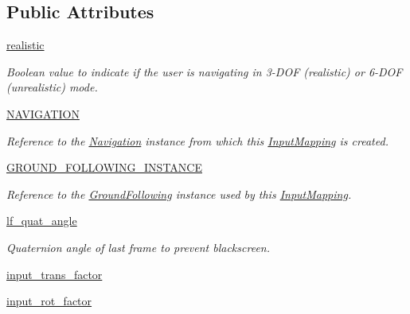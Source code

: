 \subsection*{\-Public \-Attributes}
\begin{DoxyCompactItemize}
\item 
\hyperlink{classlib_1_1InputMapping_1_1InputMapping_a396458f246bffe449a0579ebea3f2180}{realistic}
\begin{DoxyCompactList}\small\item\em \-Boolean value to indicate if the user is navigating in 3-\/\-D\-O\-F (realistic) or 6-\/\-D\-O\-F (unrealistic) mode. \end{DoxyCompactList}\item 
\hyperlink{classlib_1_1InputMapping_1_1InputMapping_a100f4ad4024ad43b6979661150401dd8}{\-N\-A\-V\-I\-G\-A\-T\-I\-O\-N}
\begin{DoxyCompactList}\small\item\em \-Reference to the \hyperlink{namespacelib_1_1Navigation}{\-Navigation} instance from which this \hyperlink{classlib_1_1InputMapping_1_1InputMapping}{\-Input\-Mapping} is created. \end{DoxyCompactList}\item 
\hyperlink{classlib_1_1InputMapping_1_1InputMapping_a1df8b547b3cd8df7a8c89c3ce682202c}{\-G\-R\-O\-U\-N\-D\-\_\-\-F\-O\-L\-L\-O\-W\-I\-N\-G\-\_\-\-I\-N\-S\-T\-A\-N\-C\-E}
\begin{DoxyCompactList}\small\item\em \-Reference to the \hyperlink{namespacelib_1_1GroundFollowing}{\-Ground\-Following} instance used by this \hyperlink{classlib_1_1InputMapping_1_1InputMapping}{\-Input\-Mapping}. \end{DoxyCompactList}\item 
\hyperlink{classlib_1_1InputMapping_1_1InputMapping_a23fb40438e3288f6b762b917fb55694e}{lf\-\_\-quat\-\_\-angle}
\begin{DoxyCompactList}\small\item\em \-Quaternion angle of last frame to prevent blackscreen. \end{DoxyCompactList}\item 
\hyperlink{classlib_1_1InputMapping_1_1InputMapping_a8fd624b0a9dab37f427ae7ffdd35a88c}{input\-\_\-trans\-\_\-factor}
\item 
\hyperlink{classlib_1_1InputMapping_1_1InputMapping_ae329d4e40a99472bc0e5fd036c60fdc0}{input\-\_\-rot\-\_\-factor}
\end{DoxyCompactItemize}
